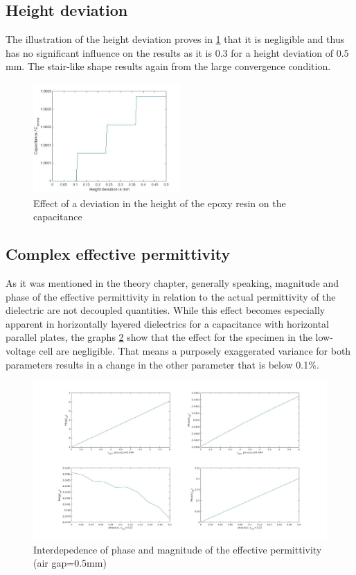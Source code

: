 \subsection{Height deviation}
The illustration of the height deviation proves in \ref{fig.heightdev} that it is negligible and thus has no significant influence on the results as it is 0.3 \text{\textperthousand} for  a height deviation of 0.5 mm. The stair-like shape results again from the large convergence condition.  
 \begin{figure}[h!tb]
	\centering
	\includegraphics[width=0.5\textwidth]{figures/Results/airgap_height/Height_deviation.jpg}		
	\caption[Kurze Abbildungsbeschreibung]{Effect of a deviation in the height of the epoxy resin on the capacitance}
	\label{fig.heightdev}
\end{figure}

\subsection{Complex effective permittivity}
\label{cep}
As it was mentioned in the theory chapter, generally speaking, magnitude and phase of the effective permittivity in relation to the
actual permittivity of the dielectric are not decoupled quantities. While this effect becomes especially apparent in horizontally layered dielectrics for
a capacitance with horizontal parallel plates, the graphs \ref{fig.complex} show that the effect for the specimen in the low-voltage cell are negligible. That means a purposely exaggerated variance for both parameters
results in a change in the other parameter that is below 0.1\%.

\begin{figure}[htbp]
	\centering
	\centerline{\includegraphics[width=\textwidth]{figures/Results/Complex/complex_permittivity_specimen}}		
	\caption[Kurze Abbildungsbeschreibung]{Interdepedence of phase and magnitude of the effective permittivity (air gap=0.5mm) } 
	\label{fig.complex}
\end{figure}


